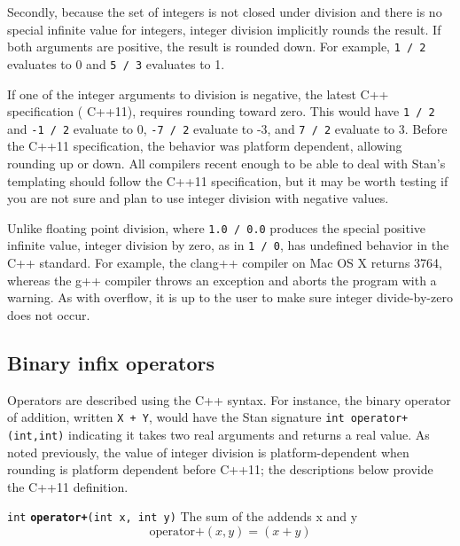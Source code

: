 \documentclass[
  10pt,
]{book}
\begin{document}
Secondly, because the set of integers is not closed under division and
there is no special infinite value for integers, integer division
implicitly rounds the result. If both arguments are positive, the
result is rounded down. For example, \texttt{1\ /\ 2} evaluates to 0 and \texttt{5\ /\ 3} evaluates to 1.

If one of the integer arguments to division is negative, the latest
C++ specification ( C++11), requires rounding toward zero. This would
have \texttt{1\ /\ 2} and \texttt{-1\ /\ 2} evaluate to 0, \texttt{-7\ /\ 2} evaluate to -3, and
\texttt{7\ /\ 2} evaluate to 3. Before the C++11 specification, the behavior
was platform dependent, allowing rounding up or down. All compilers
recent enough to be able to deal with Stan's templating should follow
the C++11 specification, but it may be worth testing if you are not
sure and plan to use integer division with negative values.

Unlike floating point division, where \texttt{1.0\ /\ 0.0} produces the special
positive infinite value, integer division by zero, as in \texttt{1\ /\ 0}, has
undefined behavior in the C++ standard. For example, the clang++
compiler on Mac OS X returns 3764, whereas the g++ compiler throws an
exception and aborts the program with a warning. As with overflow, it
is up to the user to make sure integer divide-by-zero does not occur.

\hypertarget{binary-infix-operators}{%
\subsection{Binary infix operators}\label{binary-infix-operators}}

Operators are described using the C++ syntax. For instance, the
binary operator of addition, written \texttt{X\ +\ Y}, would have the Stan
signature \texttt{int\ operator+(int,int)} indicating it takes two real
arguments and returns a real value. As noted previously, the value of
integer division is platform-dependent when rounding is platform
dependent before C++11; the descriptions below provide the C++11
definition.


\texttt{int} \textbf{\texttt{operator+}}\texttt{(int\ x,\ int\ y)}\newline
The sum of the addends x and y \[ \text{operator+}(x,y) = (x + y) \]

\end{document}
